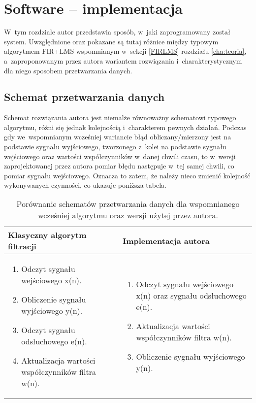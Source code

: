 \chapter{Software -- implementacja}
\label{cha:software}
W~tym rozdziale autor przedstawia sposób, w~jaki zaprogramowany został system. Uwzględnione oraz pokazane są tutaj różnice między typowym algorytmem FIR+LMS wspomnianym w~sekcji \ref{FIRLMS} rozdziału \ref{cha:teoria}, a~zaproponowanym przez autora wariantem rozwiązania i~charakterystycznym dla niego sposobem przetwarzania danych.
 
\section{Schemat przetwarzania danych}
Schemat rozwiązania autora jest niemalże równoważny schematowi typowego algorytmu, różni się jednak kolejnością i~charakterem pewnych działań. Podczas gdy we~wspomnianym wcześniej wariancie błąd obliczany/mierzony jest na podstawie sygnału wyjściowego, tworzonego z~kolei na podstawie sygnału wejściowego oraz wartości współczynników w~danej chwili czasu, to w~wersji zaprojektowanej przez autora pomiar błędu następuje w~tej samej chwili, co pomiar sygnału wejściowego. Oznacza to zatem, że należy nieco zmienić kolejność wykonywanych czynności, co ukazuje poniższa tabela.
\begin{table}[h]
	\centering
	\caption{Porównanie schematów przetwarzania danych dla wspomnianego wcześniej algorytmu oraz wersji użytej przez autora.}
	\begin{tabular}{|p{}|p{}|}
		
		\toprule Klasyczny algorytm filtracji & Implementacja autora \\ \midrule
		\begin{enumerate}	
			\item Odczyt sygnału wejściowego x(n).
			\item Obliczenie sygnału wyjściowego y(n).
			\item Odczyt sygnału odsłuchowego e(n).
			\item Aktualizacja wartości współczynników filtra w(n).
		\end{enumerate} & 
		\begin{enumerate}	
			\item Odczyt sygnału wejściowego x(n) oraz sygnału odsłuchowego e(n).
			\item Aktualizacja wartości współczynników filtra w(n).
			\item Obliczenie sygnału wyjściowego y(n).
		\end{enumerate}\\ \bottomrule
	\end{tabular}
\end{table}

